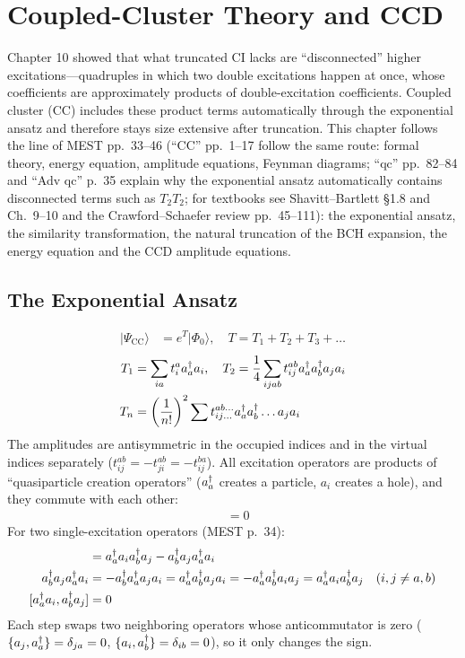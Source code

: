 \chapter{Coupled-Cluster Theory and CCD}
\label{ch:cc}

Chapter 10 showed that what truncated CI lacks are ``disconnected'' higher excitations---quadruples in which two double excitations happen at once, whose coefficients are approximately products of double-excitation coefficients. Coupled cluster (CC) includes these product terms automatically through the exponential ansatz and therefore stays size extensive after truncation. This chapter follows the line of MEST pp.~33--46 (“CC” pp.~1--17 follow the same route: formal theory, energy equation, amplitude equations, Feynman diagrams; “qc” pp.~82--84 and “Adv qc” p.~35 explain why the exponential ansatz automatically contains disconnected terms such as $T_2 T_2$; for textbooks see Shavitt--Bartlett §1.8 and Ch.~9--10 and the Crawford--Schaefer review pp.~45--111): the exponential ansatz, the similarity transformation, the natural truncation of the BCH expansion, the energy equation and the CCD amplitude equations.

\section{The Exponential Ansatz}

\begin{align*}
|\Psi_{\text{CC}}\rangle &= e^{T} |\Phi_0\rangle, \quad T = T_1 + T_2 + T_3 + \dots
\end{align*}
\begin{align*}
T_1 &= \sum_{ia} t_i^a a^{\dagger}_{a} a_{i}, \quad T_2 = \frac{1}{4} \sum_{ijab} t_{ij}^{ab} a^{\dagger}_{a} a^{\dagger}_{b} a_{j} a_{i} \\
T_n &= \left(\frac{1}{n!}\right)^2 \sum t_{ij\ldots}^{ab\ldots} a^{\dagger}_{a} a^{\dagger}_{b} \ldots a_{j} a_{i}
\end{align*}
The amplitudes are antisymmetric in the occupied indices and in the virtual indices separately ($t_{ij}^{ab} = -t_{ji}^{ab} = -t_{ij}^{ba}$). All excitation operators are products of ``quasiparticle creation operators'' ($a^{\dagger}_{a}$ creates a particle, $a_i$ creates a hole), and they commute with each other:
\begin{align*}
[T_m, T_n] &= 0
\end{align*}
For two single-excitation operators (MEST p.~34):
\begin{align*}
[\cre{a} \ann{i}, \cre{b} \ann{j}] &= \cre{a} \ann{i} \cre{b} \ann{j} - \cre{b} \ann{j} \cre{a} \ann{i} \\
\cre{b} \ann{j} \cre{a} \ann{i} &= -\cre{b} \cre{a} \ann{j} \ann{i} = \cre{a} \cre{b} \ann{j} \ann{i} = -\cre{a} \cre{b} \ann{i} \ann{j} = \cre{a} \ann{i} \cre{b} \ann{j} \eqnote{$i, j \neq a, b$} \\
[\cre{a} \ann{i}, \cre{b} \ann{j}] &= 0
\end{align*}
Each step swaps two neighboring operators whose anticommutator is zero ($\{a_{j}, a^{\dagger}_{a}\} = \delta_{ja} = 0$, $\{a_{i}, a^{\dagger}_{b}\} = \delta_{ib} = 0$), so it only changes the sign.

